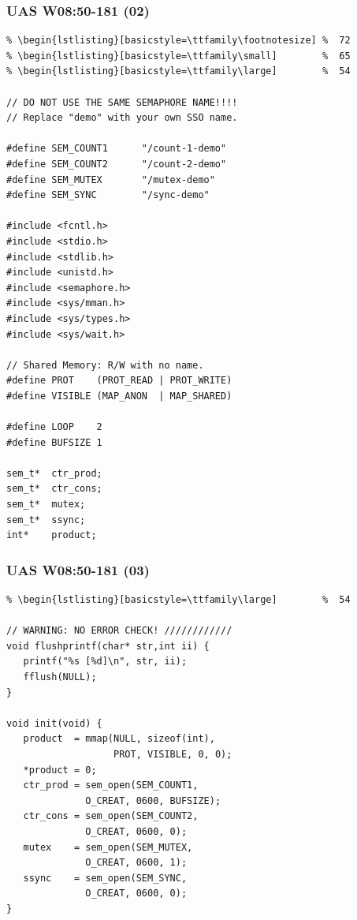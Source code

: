 \documentclass[aspectratio=169, xcolor=table, notheorems, hyperref={pdfpagelabels=false}]{beamer}
\begin{document}
\begin{frame}[fragile]
\frametitle{UAS W08:50-181 (02)}
\begin{lstlisting}[basicstyle=\ttfamily\tiny]         % 108
% \begin{lstlisting}[basicstyle=\ttfamily\tiny]         % 108
% \begin{lstlisting}[basicstyle=\ttfamily\footnotesize] %  72
% \begin{lstlisting}[basicstyle=\ttfamily\small]        %  65
% \begin{lstlisting}[basicstyle=\ttfamily\large]        %  54

// DO NOT USE THE SAME SEMAPHORE NAME!!!!
// Replace "demo" with your own SSO name.

#define SEM_COUNT1      "/count-1-demo"
#define SEM_COUNT2      "/count-2-demo"
#define SEM_MUTEX       "/mutex-demo"
#define SEM_SYNC        "/sync-demo"

#include <fcntl.h>
#include <stdio.h>
#include <stdlib.h>
#include <unistd.h>
#include <semaphore.h>
#include <sys/mman.h>
#include <sys/types.h>
#include <sys/wait.h>

// Shared Memory: R/W with no name.
#define PROT    (PROT_READ | PROT_WRITE)
#define VISIBLE (MAP_ANON  | MAP_SHARED)

#define LOOP    2
#define BUFSIZE 1

sem_t*  ctr_prod;
sem_t*  ctr_cons;
sem_t*  mutex;
sem_t*  ssync;
int*    product;

\end{lstlisting}
\end{frame}

\begin{frame}[fragile]
\frametitle{UAS W08:50-181 (03)}
\begin{lstlisting}[basicstyle=\ttfamily\footnotesize] %  72
% \begin{lstlisting}[basicstyle=\ttfamily\small]        %  65
% \begin{lstlisting}[basicstyle=\ttfamily\large]        %  54

// WARNING: NO ERROR CHECK! ////////////
void flushprintf(char* str,int ii) {
   printf("%s [%d]\n", str, ii);
   fflush(NULL);
}

void init(void) {
   product  = mmap(NULL, sizeof(int), 
                   PROT, VISIBLE, 0, 0);
   *product = 0;
   ctr_prod = sem_open(SEM_COUNT1, 
              O_CREAT, 0600, BUFSIZE);
   ctr_cons = sem_open(SEM_COUNT2, 
              O_CREAT, 0600, 0);
   mutex    = sem_open(SEM_MUTEX, 
              O_CREAT, 0600, 1);
   ssync    = sem_open(SEM_SYNC, 
              O_CREAT, 0600, 0);
}

\end{lstlisting}
\end{frame}
\end{document}
